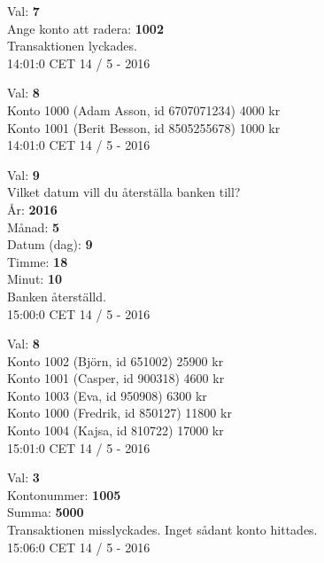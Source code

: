 \begin{multicols}{2}
\begin{exampleblock}
Val: \textbf{7}\\
Ange konto att radera: \textbf{1002}\\
Transaktionen lyckades.\\
14:01:0 CET 14 / 5 - 2016\\
\end{exampleblock}
\begin{exampleblock}
Val: \textbf{8}\\
Konto 1000 (Adam Asson, id 6707071234) 4000 kr\\
Konto 1001 (Berit Besson, id 8505255678) 1000 kr\\
14:01:0 CET 14 / 5 - 2016\\
\end{exampleblock}
\begin{exampleblock}
Val: \textbf{9}\\
Vilket datum vill du återställa banken till?\\
År: \textbf{2016}\\
Månad: \textbf{5}\\
Datum (dag): \textbf{9}\\
Timme: \textbf{18}\\
Minut: \textbf{10}\\
Banken återställd.\\
15:00:0 CET 14 / 5 - 2016\\
\end{exampleblock}
\begin{exampleblock}
Val: \textbf{8}\\
Konto 1002 (Björn, id 651002) 25900 kr\\
Konto 1001 (Casper, id 900318) 4600 kr\\
Konto 1003 (Eva, id 950908) 6300 kr\\
Konto 1000 (Fredrik, id 850127) 11800 kr\\
Konto 1004 (Kajsa, id 810722) 17000 kr\\
15:01:0 CET 14 / 5 - 2016\\
\end{exampleblock}
\begin{exampleblock}
Val: \textbf{3}\\
Kontonummer: \textbf{1005}\\
Summa: \textbf{5000}\\
Transaktionen misslyckades. Inget sådant konto hittades.\\
15:06:0 CET 14 / 5 - 2016\\
\end{exampleblock}

\end{multicols}

